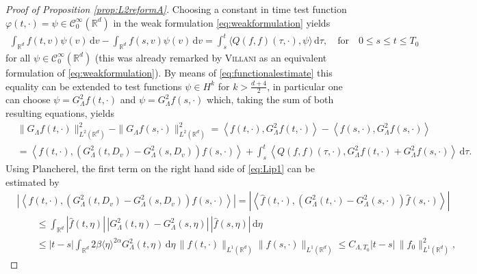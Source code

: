\documentclass[11pt,a4paper,reqno]{amsart}
\theoremstyle{plain}
\theoremstyle{definition}
\begin{document}
\begin{proof}[Proof of Proposition \ref{prop:L2reformA}]
Choosing a constant in time test function $\varphi(t,\cdot) = \psi \in \mathcal{C}^{\infty}_0({\mathbb{R}}^d)$ in the weak formulation \eqref{eq:weakformulation} yields
\begin{align*}
	\int_{{\mathbb{R}}^d} f(t,v)\psi(v) \,\mathrm{d}v - \int_{{\mathbb{R}}^d} f(s,v)\psi(v)\,\mathrm{d}v = \int_s^t \langle Q(f,f)(\tau, \cdot), \psi\rangle \,\mathrm{d}\tau, \quad \text{for}\quad 0\leq s \leq t \leq T_0
\end{align*}
for all $\psi\in\mathcal{C}^{\infty}_0({\mathbb{R}}^d)$ (this was already remarked by \textsc{Villani} \cite{Vil98} as an equivalent formulation of \eqref{eq:weakformulation}). By means of \eqref{eq:functionalestimate} this equality can be extended to test functions $\psi \in H^{k}$ for $k>\frac{d+4}{2}$, in particular one can choose $\psi = G_{\Lambda}^2 f(t, \cdot)$ and $\psi=G_{\Lambda}^2 f(s, \cdot)$ which, taking the sum of both resulting equations, yields
\begin{equation} \label{eq:Lip1}
  \begin{split}
	&\|G_{\Lambda}f(t, \cdot)\|_{L^2({\mathbb{R}}^d)}^2 - \|G_{\Lambda}f(s,\cdot)\|_{L^2({\mathbb{R}}^d)}^2
	   =  \left\langle f(t,\cdot), G_{\Lambda}^2 f(t,\cdot) \right\rangle - \left\langle f(s,\cdot), G_{\Lambda}^2 f(s,\cdot) \right\rangle \\
	 &=
	   \left\langle f(t,\cdot), \left( G_{\Lambda}^2(t,D_v) - G_{\Lambda}^2(s,D_v) \right) f(s,\cdot) \right\rangle
	    + \int_{s}^t \left\langle Q(f,f)(\tau, \cdot), G_{\Lambda}^2 f(t, \cdot) + G_{\Lambda}^2 f(s, \cdot) \right\rangle \,\mathrm{d}\tau.
  \end{split}
\end{equation}
Using Plancherel, the first term on the right hand side of \eqref{eq:Lip1} can be estimated by
\begin{align*}
	& \left| \left\langle f(t,\cdot),   \left( G_{\Lambda}^2(t,D_v) - G_{\Lambda}^2(s,D_v) \right) f(s,\cdot) \right\rangle \right|
	   = \left| \left\langle \hat{f}(t,\cdot),  \left( G_{\Lambda}^2(t,\cdot) - G_{\Lambda}^2(s,\cdot) \right) \hat{f}(s,\cdot) \right\rangle \right|  \\
	&\qquad  \leq \int_{{\mathbb{R}}^d} |\hat{f}(t,\eta)| \, |G_{\Lambda}^2(t,\eta) - G_{\Lambda}^2(s,\eta)|\, |\hat{f}(s,\eta)| \,\mathrm{d}\eta \\
	& \qquad \leq |t-s| \int_{{\mathbb{R}}^d} 2\beta \langle\eta\rangle^{2\alpha} G_{\Lambda}^2(t,\eta)\, \mathrm{d}\eta \,\|f(t,\cdot)\|_{L^1({\mathbb{R}}^d)} \|f(s,\cdot)\|_{L^1({\mathbb{R}}^d)} \leq C_{\Lambda,T_0} |t-s| \, \|f_0\|_{L^1({\mathbb{R}}^d)}^2,

\end{align*}
\end{proof}
\end{document}
